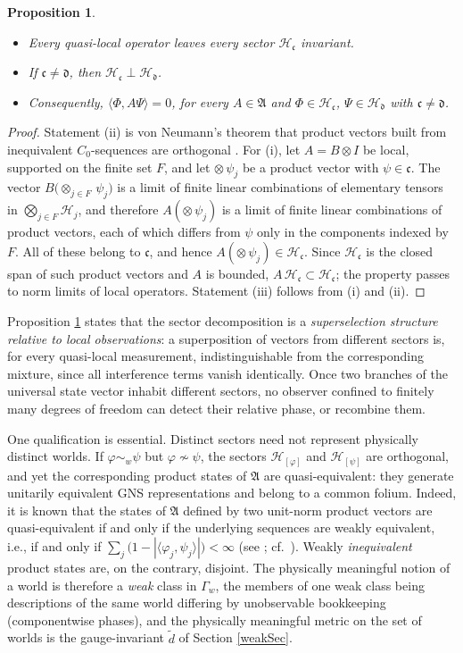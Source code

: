 \documentclass[twoside,11pt,letter]{article}
\def\cH{{\mathcal{H}}}
\def\fc{{\mathfrak{c}}}
\def\fd{{\mathfrak{d}}}
\theoremstyle{definition}
\theoremstyle{definition}
\theoremstyle{plain}
\newtheorem{proposition}[theorem]{Proposition}
\begin{document}
\begin{proposition}\label{sectorProp}
\begin{itemize}
\item[(i)]{Every quasi-local operator leaves every sector $\cH_\fc$ invariant.}
\item[(ii)]{If $\fc\neq\fd$, then $\cH_\fc\perp\cH_\fd$.}
\item[(iii)]{Consequently, $\langle\Phi,A\Psi\rangle=0$, for every $A\in\mathfrak{A}$ and $\Phi\in\cH_\fc$, $\Psi\in\cH_\fd$ with $\fc\neq\fd$.}
\end{itemize}
\end{proposition}
\begin{proof}
Statement (ii) is von Neumann's theorem that product vectors built from inequivalent $C_0$-sequences are orthogonal \cite{vN39}. For (i), let $A=B\otimes I$ be local, supported on the finite set $F$, and let $\otimes\,\psi_j$ be a product vector with $\psi\in\fc$. The vector $B\big(\otimes_{j\in F}\,\psi_j\big)$ is a limit of finite linear combinations of elementary tensors in $\bigotimes_{j\in F}\cH_j$, and therefore $A(\otimes\,\psi_j)$ is a limit of finite linear combinations of product vectors, each of which differs from $\psi$ only in the components indexed by $F$. All of these belong to $\fc$, and hence $A(\otimes\,\psi_j)\in\cH_\fc$. Since $\cH_\fc$ is the closed span of such product vectors and $A$ is bounded, $A\,\cH_\fc\subset\cH_\fc$; the property passes to norm limits of local operators. Statement (iii) follows from (i) and (ii).
\end{proof}

Proposition \ref{sectorProp} states that the sector decomposition is a \emph{superselection structure relative to local observations}: a superposition of vectors from different sectors is, for every quasi-local measurement, indistinguishable from the corresponding mixture, since all interference terms vanish identically. Once two branches of the universal state vector inhabit different sectors, no observer confined to finitely many degrees of freedom can detect their relative phase, or recombine them.

One qualification is essential. Distinct sectors need not represent physically distinct worlds. If $\varphi\sim_w\psi$ but $\varphi\not\sim\psi$, the sectors $\cH_{[\varphi]}$ and $\cH_{[\psi]}$ are orthogonal, and yet the corresponding product states of $\mathfrak{A}$ are quasi-equivalent: they generate unitarily equivalent GNS representations and belong to a common folium. Indeed, it is known that the states of $\mathfrak{A}$ defined by two unit-norm product vectors are quasi-equivalent if and only if the underlying sequences are weakly equivalent, i.e., if and only if $\sum_j\big(1-|\langle\varphi_j,\psi_j\rangle|\big)<\infty$ (see \cite{P67}; cf.\ \cite{KSW03}). Weakly \emph{inequivalent} product states are, on the contrary, disjoint. The physically meaningful notion of a world is therefore a \emph{weak} class in $\Gamma_w$, the members of one weak class being descriptions of the same world differing by unobservable bookkeeping (componentwise phases), and the physically meaningful metric on the set of worlds is the gauge-invariant $\tilde d$ of Section \ref{weakSec}.
\end{document}
